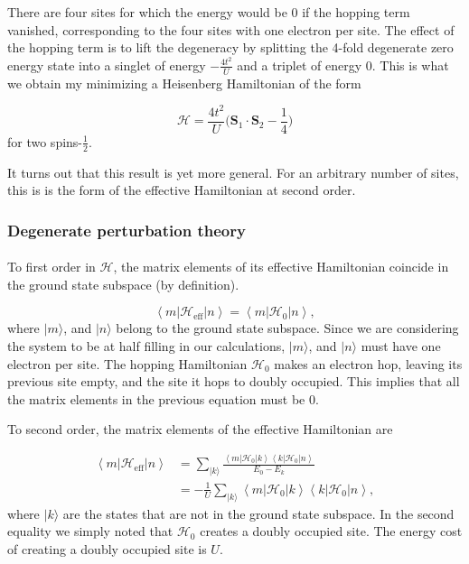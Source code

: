 \documentclass[10pt, twocolumn, twoside]{article}
\begin{document}
There are four sites for which the energy would be 0 if the hopping term vanished, corresponding to the four sites with one electron per site. The effect of the hopping term is to lift the degeneracy by splitting the 4-fold degenerate zero energy state into a singlet of energy $-\frac{4t^2}{U}$ and a triplet of energy $0$. This is what we obtain my minimizing a Heisenberg Hamiltonian of the form

\begin{equation}
\mathcal{H} = \frac{4t^2}{U} \bigg( \bm S_1 \cdot \bm S_2 - \frac{1}{4} \bigg)
\end{equation}
for two spins-$\frac{1}{2}$.

It turns out that this result is yet more general. For an arbitrary number of sites, this is is the form of the effective Hamiltonian at second order.

\subsubsection{Degenerate perturbation theory}\paragraph{}

To first order in $\mathcal{H}$, the matrix elements of its effective Hamiltonian coincide in the ground state subspace (by definition).

\begin{equation}
\left\langle m | \mathcal{H}_{\text{eff}} | n \right\rangle = \left\langle m | \mathcal{H}_0 | n \right\rangle ,
\end{equation}
where $| m \rangle$, and $| n \rangle$ belong to the ground state subspace. Since we are considering the system to be at half filling in our calculations, $| m\rangle$, and $| n \rangle$ must have one electron per site. The hopping Hamiltonian $\mathcal{H}_0$ makes an electron hop, leaving its previous site empty, and the site it hops to doubly occupied. This implies that all the matrix elements in the previous equation must be 0.

To second order, the matrix elements of the effective Hamiltonian are

\begin{equation}
\begin{split}
\left \langle m | \mathcal{H}_{\text{eff}} | n \right\rangle &= \sum_{ | k \rangle} \frac{\left\langle m | \mathcal{H}_0 | k \right\rangle \left\langle k | \mathcal{H}_0 | n \right\rangle }{E_0 - E_k} \\
&=-\frac{1}{U} \sum_{ | k \rangle} \left\langle m | \mathcal{H}_0 | k \right\rangle \left\langle k | \mathcal{H}_0 | n \right\rangle ,
\end{split}
\end{equation}
where $| k \rangle$ are the states that are not in the ground state subspace. In the second equality we simply noted that $\mathcal{H}_0$ creates a doubly occupied site. The energy cost of creating a doubly occupied site is $U$. 
\end{document}

